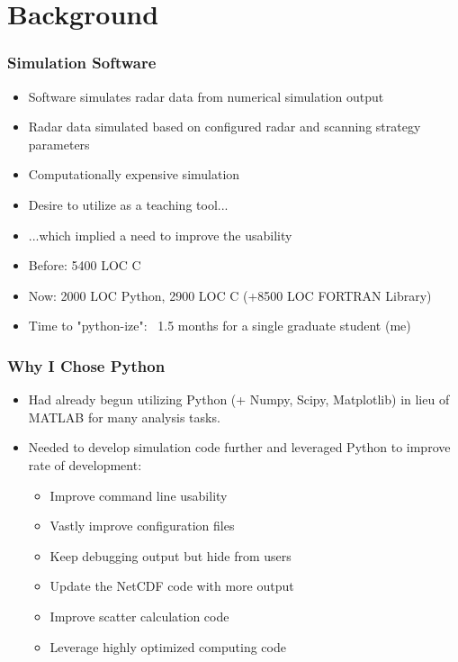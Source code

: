 \documentclass[red, hyperref={pdfpagelabels=false}]{beamer}
\begin{document}
\section{Background}
\begin{frame}[<+->]
  \frametitle{Simulation Software}
  \begin{itemize}
    \item Software simulates radar data from numerical simulation output
    \item Radar data simulated based on configured radar and scanning strategy parameters
    \item Computationally expensive simulation
    \item Desire to utilize as a teaching tool...
    \item ...which implied a need to improve the usability
    \item Before: 5400 LOC C
    \item Now: 2000 LOC Python, 2900 LOC C (+8500 LOC FORTRAN Library)
    \item Time to "python-ize": ~1.5 months for a single graduate student (me)
  \end{itemize}
\end{frame}

\begin{frame}[<+->]
  \frametitle{Why I Chose Python}
  \begin{itemize}
    \item Had already begun utilizing Python (+ Numpy, Scipy, Matplotlib) in lieu of MATLAB
        for many analysis tasks.
    \item Needed to develop simulation code further and leveraged Python to improve rate of development:
    \begin{itemize}
      \item<3-> Improve command line usability 
      \item<3-> Vastly improve configuration files 
      \item<3-> Keep debugging output but hide from users 
      \item<3-> Update the NetCDF code with more output 
      \item<3-> Improve scatter calculation code
      \item<3-> Leverage highly optimized computing code
    \end{itemize}
  \end{itemize}
\end{frame}
\end{document}
